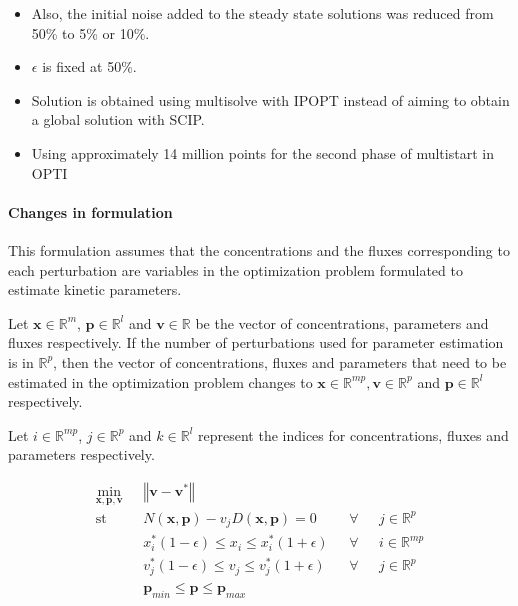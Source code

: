\documentclass[10pt]{report}
\begin{document}
	\begin{itemize}
		\item Also, the initial noise added to the steady state solutions was reduced from 50\% to 5\% or 10\%.
		\item $\epsilon$ is fixed at 50\%.
		\item Solution is obtained using multisolve with IPOPT instead of aiming to obtain a global solution with SCIP.
		\item Using approximately 14 million points for the second phase of multistart in OPTI
	\end{itemize}

\paragraph{Changes in formulation}
This formulation assumes that the concentrations and the fluxes corresponding to each perturbation are variables in the optimization problem formulated to estimate kinetic parameters.

Let $\mathbf{x}\in\mathbb{R}^m$, $\mathbf{p}\in\mathbb{R}^l$ and $\mathbf{v}\in\mathbb{R}$ be the vector of concentrations, parameters and fluxes respectively. If the number of perturbations used for parameter estimation is in $\mathbb{R}^p$, then the vector of concentrations, fluxes and parameters that need to be estimated in the optimization problem changes to $\mathbf{x}\in\mathbb{R}^{mp}, \mathbf{v}\in\mathbb{R}^{p}$ and $\mathbf{p}\in\mathbb{R}^{l}$ respectively. 

Let $i\in\mathbb{R}^{mp}$, $j\in\mathbb{R}^{p}$ and $k\in\mathbb{R}^{l}$ represent the indices for concentrations, fluxes and parameters respectively.

\begin{center}
	\begin{subequations}
		\begin{align}
		\underset{\mathbf{x},\mathbf{p},\mathbf{v}}{\mathrm{min}} & \text{      }\left\Vert \mathbf{v}-\mathbf{v}^*\right\Vert\\
		\mathrm{st}& \text{      }N(\mathbf{x},\mathbf{p}) - v_jD(\mathbf{x},\mathbf{p}) = 0 & \text{  }\forall & \text{ }j\in\mathbb{R}^p\\
		& \text{      }x^*_i(1-\epsilon)\le x_i \le x^*_i(1+\epsilon) & \text{  }\forall & \text{ }i\in\mathbb{R}^{mp}\\	
		& \text{      }v^*_j(1-\epsilon)\le v_j \le v^*_j(1+\epsilon) & \text{  }\forall & \text{ }j\in\mathbb{R}^{p}\\		
		& \text{      }\mathbf{p}_{min} \le \mathbf{p} \le \mathbf{p}_{max}
		\end{align}
	\end{subequations}
\end{center}
\end{document}
